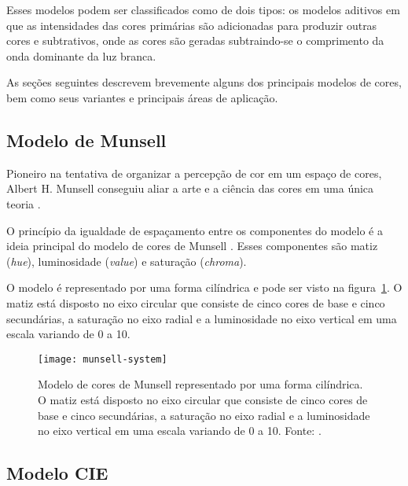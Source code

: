 Esses modelos podem ser classificados como de dois tipos: os modelos aditivos em que as intensidades das cores primárias são adicionadas para produzir outras cores e subtrativos, onde as cores são geradas subtraindo-se o comprimento da onda dominante da luz branca.

As seções seguintes descrevem brevemente alguns dos principais modelos de cores, bem como seus variantes e principais áreas de aplicação.

\subsection{Modelo de Munsell}
\label{sec:modelo_cores_munsell}

Pioneiro na tentativa de organizar a percepção de cor em um espaço de cores, Albert H. Munsell conseguiu aliar a arte e a ciência das cores em uma única teoria \citep{konstantinos:00}.

O princípio da igualdade de espaçamento entre os componentes do modelo é a ideia principal do modelo de cores de Munsell \citep{konstantinos:00}. Esses componentes são matiz (\textit{hue}), luminosidade (\textit{value}) e saturação (\textit{chroma}).

O modelo é representado por uma forma cilíndrica e pode ser visto na figura~\ref{fig:munsell-system}. O matiz está disposto no eixo circular que consiste de cinco cores de base e cinco secundárias, a saturação no eixo radial e a luminosidade no eixo vertical em uma escala variando de 0 a 10.

\begin{figure}[!h]
  \centering
  \texttt{[image: munsell-system]}
  \caption[Modelo de cores de Munsell.]{Modelo de cores de Munsell representado por uma forma cilíndrica. O matiz está disposto no eixo circular que consiste de cinco cores de base e cinco secundárias, a saturação no eixo radial e a luminosidade no eixo vertical em uma escala variando de 0 a 10. Fonte: \citet{rus:07}.}
  \label{fig:munsell-system} 
\end{figure}

\subsection{Modelo CIE}
\label{sec:modelo_cores_cie}

